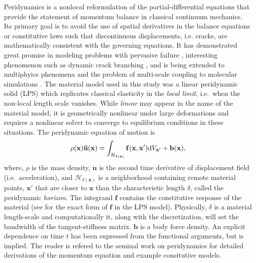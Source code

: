 \documentclass[preprint,12pt]{elsarticle}
\begin{document}
 Peridynamics \cite{silling2000ret,silling:psa,silling2010peridynamic} is a nonlocal reformulation of the partial-differential equations that provide the statement of momentum balance in classical continuum mechanics. Its primary goal is to avoid the use of spatial derivatives in the balance equations or constitutive laws such that discontinuous displacements, i.e. cracks, are mathematically consistent with the governing equations. It has demonstrated great promise in modeling problems with pervasive failure \cite{littlewood2010}, interesting phenomenon such as dynamic crack branching \cite{ha2010sod}, and is being extended to multiphyics phenomena \cite{bobaru2011peridynamic,katiyar2013} and the problem of multi-scale coupling to molecular simulations \cite{seleson2009peridynamics,seleson2014atom,rahman2013b}.  The material model used in this study was a linear peridynamic solid (LPS) which replicates classical elasticity in the \emph{local limit}, i.e.\ when the non-local length scale vanishes. While \emph{linear} may appear in the name of the material model, it is geometrically nonlinear under large deformations and requires a nonlinear solver to converge to equilibrium conditions in these situations.  The peridynamic equation of motion is 
%
\begin{equation} 
    \rho(\mathbf{x})\mathbf{\ddot{u}(x)} = \int_{\mathcal{H_{\delta(\mathbf{x})}}} \mathbf{f(x,x'}) {\rm d}V_{\mathbf{x'}} + \mathbf{b(x)},
    \label{eqn:PDMotion}
\end{equation} 
%
where, $\rho$ is the mass density, $\mathbf{\ddot{u}}$ is the second time derivative of displacement field (i.e.\ acceleration), and $\mathcal{H}_{\delta(\mathbf{x})}$ is a neighborhood containing remote material points, $\mathbf{x'}$ that are closer to $\mathbf{x}$ than the characteristic length $\delta$, called the peridynamic \emph{horizon}. The integrand $\mathbf{f}$ contains the constitutive response of the material (see \cite{silling:psa} for the exact form of $\mathbf{f}$ in the LPS model).  Physically, $\delta$ is a material length-scale and computationally it, along with the discretization, will set the bandwidth of the tangent-stiffness matrix. $\mathbf{b}$ is a body force density.  An explicit dependence on time $t$ has been supressed from the functional arguments, but is implied.  The reader is refered to the seminal work on peridynamics \cite{silling:psa} for detailed derivations of the momentum equation and example consitutive models.
\end{document}
